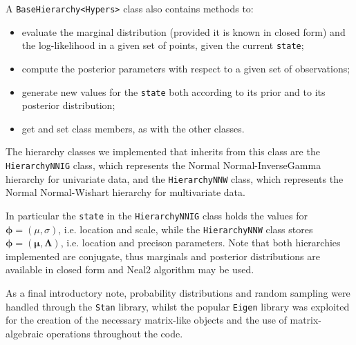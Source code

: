 \begin{itemize}
	A \verb|BaseHierarchy<Hypers>| class also contains methods to:
	\begin{itemize}
		\item evaluate the marginal distribution (provided it is known in closed form) and the log-likelihood in a given set of points, given the current \verb|state|;
		\item compute the posterior parameters with respect to a given set of observations;
		\item generate new values for the \verb|state| both according to its prior and to its posterior distribution;
		\item get and set class members, as with the other classes.
	\end{itemize}


The hierarchy classes we implemented that inherits from this class are the \verb|HierarchyNNIG| class, which represents the Normal Normal-InverseGamma hierarchy for univariate data, and the \verb|HierarchyNNW| class, which represents the Normal Normal-Wishart hierarchy for multivariate data.

In particular the \verb|state| in the \verb|HierarchyNNIG| class holds the values for $\boldsymbol\phi = (\mu,\sigma)$, i.e.  location and scale, while the \verb|HierarchyNNW| class stores $\boldsymbol\phi = (\mathbf{\mu},\mathbf{\Lambda})$, i.e. location and precison parameters.
Note that both hierarchies implemented are conjugate, thus marginals and
posterior distributions are available in closed form and Neal2 algorithm may be used.
	
	
\end{itemize}

As a final introductory note, probability distributions and random sampling were handled through the \verb|Stan| library, whilst the popular \verb|Eigen| library was exploited for the creation of the necessary matrix-like objects and the use of matrix-algebraic operations throughout the code.